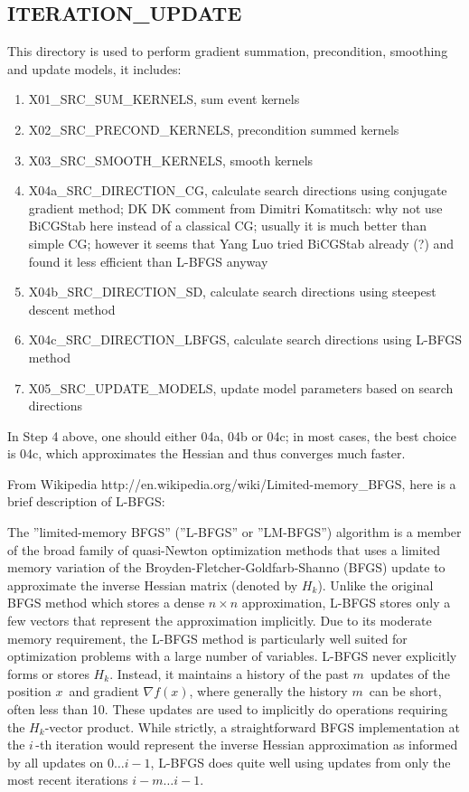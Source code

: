 \documentclass[11pt]{article}
\begin{document}
\subsection{ITERATION\_UPDATE}
This directory is used to perform gradient summation, precondition, smoothing and update models, it includes:
\begin{enumerate}
\item X01\_SRC\_SUM\_KERNELS, sum event kernels
\item X02\_SRC\_PRECOND\_KERNELS, precondition summed kernels
\item X03\_SRC\_SMOOTH\_KERNELS, smooth kernels
\item X04a\_SRC\_DIRECTION\_CG, calculate search directions using conjugate gradient method; DK DK comment from Dimitri Komatitsch: why not use BiCGStab here
instead of a classical CG; usually it is much better than simple CG; however it seems that Yang Luo tried BiCGStab already (?) and found it less efficient than L-BFGS anyway
\item X04b\_SRC\_DIRECTION\_SD, calculate search directions using steepest descent method
\item X04c\_SRC\_DIRECTION\_LBFGS, calculate search directions using L-BFGS method
\item X05\_SRC\_UPDATE\_MODELS, update model parameters based on search directions
\end{enumerate}

In Step 4 above, one should either 04a, 04b or 04c; in most cases, the best choice is 04c, which approximates the Hessian and thus 
converges much faster.

From Wikipedia http://en.wikipedia.org/wiki/Limited-memory\_BFGS, here is a brief description of L-BFGS:

The ''limited-memory BFGS'' (''L-BFGS'' or ''LM-BFGS'') algorithm is a member of the broad family of quasi-Newton optimization methods that uses a limited memory variation of the Broyden-Fletcher-Goldfarb-Shanno (BFGS) update to approximate the inverse Hessian matrix (denoted by $H_k$). Unlike the original BFGS method which stores a dense $ n \times n $ approximation, L-BFGS stores only a few vectors that represent the approximation implicitly. Due to its moderate memory requirement, the L-BFGS method is particularly well suited for optimization problems with a large number of variables.  L-BFGS never explicitly forms or stores $H_k$.  Instead, it maintains a history of the past $m\,\!$ updates of the position  $x\,\!$ and gradient  $\nabla f(x)$, where generally the history  $m\,\!$ can be short, often less than 10.  These updates are used to implicitly do operations requiring the $H_k$-vector product.  While strictly, a straightforward BFGS implementation at the  $i\,\!$-th iteration would represent the inverse Hessian approximation as informed by all updates on  $0 \ldots i-1$, L-BFGS does quite well using updates from only the most recent iterations  $i-m \ldots i-1$.
\end{document}
